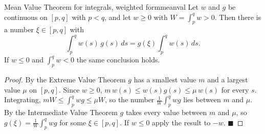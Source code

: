 \documentclass[11pt]{article}
\begin{document}
\begin{thm}{Mean Value Theorem for integrals, weighted form}{meanval}
Let $w$ and $g$ be continuous on $[p,q]$ with $p<q$, and let $w\ge0$ with $W=\int_p^qw>0$. Then there is a number $\xi\in[p,q]$ with
\[\int_p^qw(s)\,g(s)\,ds=g(\xi)\int_p^qw(s)\,ds.\]
If $w\le0$ and $\int_p^qw<0$ the same conclusion holds.
\end{thm}
\begin{proof}
By the Extreme Value Theorem $g$ has a smallest value $m$ and a largest value $\mu$ on $[p,q]$. Since $w\ge0$, $m\,w(s)\le w(s)g(s)\le\mu\,w(s)$ for every $s$. Integrating, $mW\le\int_p^qwg\le\mu W$, so the number $\frac1W\int_p^qwg$ lies between $m$ and $\mu$. By the Intermediate Value Theorem $g$ takes every value between $m$ and $\mu$, so $g(\xi)=\frac1W\int_p^qwg$ for some $\xi\in[p,q]$. If $w\le0$ apply the result to $-w$. $\blacksquare$
\end{proof}
\end{document}

